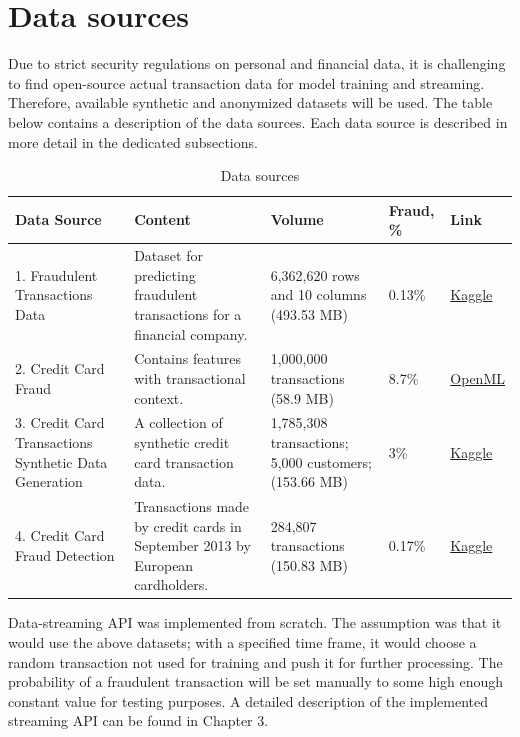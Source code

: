 \documentclass[12pt,a4paper, hidelinks]{article}
\begin{document}
\newpage

\section{Data sources}

Due to strict security regulations on personal and financial data, it is challenging to find open-source actual transaction data for model training and streaming. Therefore, available synthetic and anonymized datasets will be used. The table below contains a description of the data sources. Each data source is described in more detail in the dedicated subsections.

\begin{table}[h!]
\centering


\begin{tabular}{|p{4.8cm}|p{3.5cm}|p{2cm}|p{2cm}|p{1.5cm}|}
\hline
\textbf{Data Source} & \textbf{Content} & \textbf{Volume} &  \textbf{Fraud, \%} & \textbf{Link} \\
\hline
1. Fraudulent Transactions Data &  Dataset for predicting fraudulent transactions for a financial company. &  6,362,620 rows and 10 columns (493.53 MB) & 0.13\% & \href{https://www.kaggle.com/datasets/chitwanmanchanda/fraudulent-transactions-data}{Kaggle} \\
\hline
2. Credit Card Fraud & Contains features with transactional context. & 1,000,000 transactions (58.9 MB) & 8.7\% & \href{https://www.openml.org/search?type=data\&status=active\&id=45955}{OpenML} \\
\hline
3. Credit Card Transactions Synthetic Data Generation & A collection of synthetic credit card transaction data. & 1,785,308 transactions; 5,000 customers; (153.66 MB) & 3\% & \href{https://www.kaggle.com/datasets/cgrodrigues/credit-card-transactions-synthetic-data-generation?select=transactions_df.csv}{Kaggle} \\
\hline
4. Credit Card Fraud Detection & Transactions made by credit cards in September 2013 by European cardholders. & 284,807 transactions (150.83 MB) & 0.17\% & \href{https://www.kaggle.com/datasets/mlg-ulb/creditcardfraud}{Kaggle} \\
\hline
\end{tabular}

\caption{Data sources}
\end{table}

Data-streaming API was implemented from scratch. The assumption was that it would use the above datasets; with a specified time frame, it would choose a random transaction not used for training and push it for further processing. The probability of a fraudulent transaction will be set manually to some high enough constant value for testing purposes. A detailed description of the implemented streaming API can be found in Chapter 3.
\end{document}
